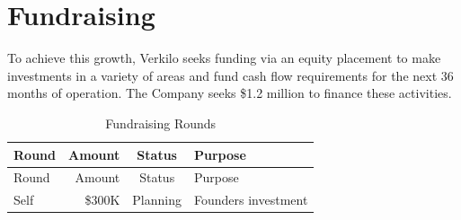 \documentclass[11pt,openany]{book}
\begin{document}
\hypertarget{fundraising}{%
\section{Fundraising}\label{fundraising}}

To achieve this growth, Verkilo seeks funding via an equity placement to
make investments in a variety of areas and fund cash flow requirements
for the next 36 months of operation. The Company seeks \$1.2 million to
finance these activities.

\begin{longtable}[]{@{}lrcl@{}}
\caption{Fundraising Rounds}\tabularnewline
\toprule
\begin{minipage}[b]{0.13\columnwidth}\raggedright
Round\strut
\end{minipage} & \begin{minipage}[b]{0.10\columnwidth}\raggedleft
Amount\strut
\end{minipage} & \begin{minipage}[b]{0.10\columnwidth}\centering
Status\strut
\end{minipage} & \begin{minipage}[b]{0.55\columnwidth}\raggedright
Purpose\strut
\end{minipage}\tabularnewline
\midrule
\endfirsthead
\toprule
\begin{minipage}[b]{0.13\columnwidth}\raggedright
Round\strut
\end{minipage} & \begin{minipage}[b]{0.10\columnwidth}\raggedleft
Amount\strut
\end{minipage} & \begin{minipage}[b]{0.10\columnwidth}\centering
Status\strut
\end{minipage} & \begin{minipage}[b]{0.55\columnwidth}\raggedright
Purpose\strut
\end{minipage}\tabularnewline
\midrule
\endhead
\begin{minipage}[t]{0.13\columnwidth}\raggedright
Self\strut
\end{minipage} & \begin{minipage}[t]{0.10\columnwidth}\raggedleft
\$300K\strut
\end{minipage} & \begin{minipage}[t]{0.10\columnwidth}\centering
Planning\strut
\end{minipage} & \begin{minipage}[t]{0.55\columnwidth}\raggedright
Founders investment\strut

\end{minipage}
\end{longtable}
\end{document}
